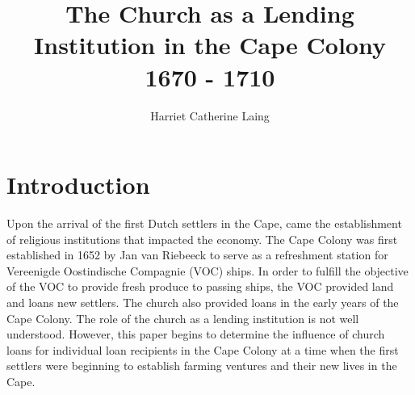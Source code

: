 \documentclass[11pt,preprint, authoryear]{elsarticle}
\numberwithin{equation}{section}
\numberwithin{figure}{section}
\numberwithin{table}{section}
\begin{document}
\begin{frontmatter}  %

\title{The Church as a Lending Institution in the Cape Colony 1670 -
1710}





\author[Add1]{Harriet Catherine Laing}





\address[Add1]{Stellenbosch University, Stellenbosch, South Africa}



\vspace{1cm}





\vspace{0.5cm}

\end{frontmatter}



\pagestyle{fancy}
\chead{}
\rhead{}
\lfoot{}
\lhead{}
\cfoot{}


\headsep 35pt %




\hypertarget{introduction}{%
\section{\texorpdfstring{Introduction
\label{Introduction}}{Introduction }}\label{introduction}}

Upon the arrival of the first Dutch settlers in the Cape, came the
establishment of religious institutions that impacted the economy. The
Cape Colony was first established in 1652 by Jan van Riebeeck to serve
as a refreshment station for Vereenigde Oostindische Compagnie (VOC)
ships. In order to fulfill the objective of the VOC to provide fresh
produce to passing ships, the VOC provided land and loans new settlers.
The church also provided loans in the early years of the Cape Colony.
The role of the church as a lending institution is not well understood.
However, this paper begins to determine the influence of church loans
for individual loan recipients in the Cape Colony at a time when the
first settlers were beginning to establish farming ventures and their
new lives in the Cape.
\end{document}
